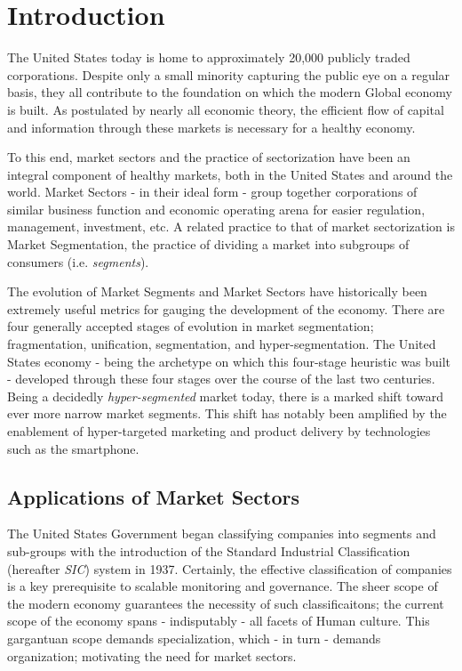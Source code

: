\documentclass[../main.tex]{subfiles}
\begin{document}
    
\chapter{Introduction}

The United States today is home to approximately 20,000 publicly traded corporations. Despite only a small minority capturing the public eye on a regular basis, they all contribute to the foundation on which the modern Global economy is built. As postulated by nearly all economic theory, the efficient flow of capital and information through these markets is necessary for a healthy economy.

To this end, market sectors and the practice of sectorization have been an integral component of healthy markets, both in the United States and around the world. Market Sectors - in their ideal form - group together corporations of similar business function and economic operating arena for easier regulation, management, investment, etc. A related practice to that of market sectorization is Market Segmentation, the practice of dividing a market into subgroups of consumers (i.e. \textit{segments}).

The evolution of Market Segments and Market Sectors have historically been extremely useful metrics for gauging the development of the economy. There are four generally accepted stages of evolution in market segmentation; fragmentation, unification, segmentation, and hyper-segmentation. The United States economy - being the archetype on which this four-stage heuristic was built - developed through these four stages over the course of the last two centuries. Being a decidedly \textit{hyper-segmented} market today, there is a marked shift toward ever more narrow market segments. This shift has notably been amplified by the enablement of hyper-targeted marketing and product delivery by technologies such as the smartphone.

\section{Applications of Market Sectors}

The United States Government began classifying companies into segments and sub-groups with the introduction of the Standard Industrial Classification (hereafter \textit{SIC}) system in 1937. Certainly, the effective classification of companies is a key prerequisite to scalable monitoring and governance. The sheer scope of the modern economy guarantees the necessity of such classificaitons; the current scope of the economy spans - indisputably - all facets of Human culture. This gargantuan scope demands specialization, which - in turn - demands organization; motivating the need for market sectors.
\end{document}
